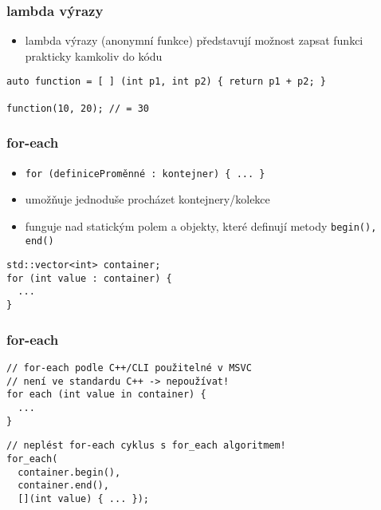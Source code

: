 \begin{frame}[fragile]
\frametitle{lambda výrazy}

\begin{bonusblock}{}
\begin{itemize}
\item lambda výrazy (anonymní funkce) představují možnost zapsat funkci prakticky kamkoliv do kódu
\end{itemize}
\end{bonusblock}

\begin{yesblock}
\begin{lstlisting}
auto function = [ ] (int p1, int p2) { return p1 + p2; }

function(10, 20); // = 30
\end{lstlisting}
\end{yesblock}
\end{frame}






\begin{frame}[fragile]
\frametitle{for-each}
\begin{bonusblock}{}
\begin{itemize}
\item \lstinline|for (definiceProměnné : kontejner) { ... }|
\item umožňuje jednoduše procházet kontejnery/kolekce
\item funguje nad statickým polem a objekty, které definují metody \lstinline|begin(), end()|
\end{itemize}
\end{bonusblock}

\begin{yesblock}
\begin{lstlisting}
std::vector<int> container;
for (int value : container) {
  ...
}
\end{lstlisting}
\end{yesblock}
\end{frame}



\begin{frame}[fragile]
\frametitle{for-each}
\begin{noblock}
\begin{lstlisting}
// for-each podle C++/CLI použitelné v MSVC
// není ve standardu C++ -> nepoužívat!
for each (int value in container) {
  ...
}
\end{lstlisting}
\end{noblock}

\begin{yesblock}
\begin{lstlisting}
// neplést for-each cyklus s for_each algoritmem!
for_each(
  container.begin(), 
  container.end(), 
  [](int value) { ... });
\end{lstlisting}
\end{yesblock}
\end{frame}



